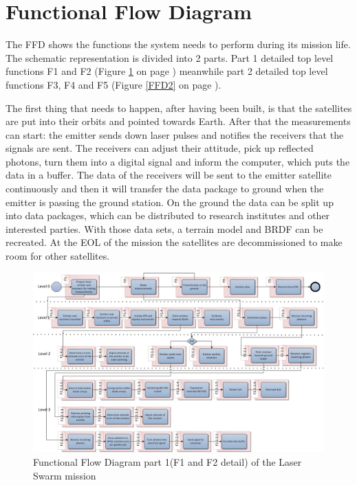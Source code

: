 \section{Functional Flow Diagram}
\label{section_FFD}
The \ac{FFD} shows the functions the system needs to perform during its mission life. The schematic representation is divided into 2 parts. Part 1 detailed top level functions F1 and F2 (Figure \ref{FFD1} on page \pageref{FFD1}) meanwhile part 2 detailed top level functions F3, F4 and F5 (Figure \ref{FFD2} on page \pageref{FFD2}).

The first thing that needs to happen, after having been built, is that the satellites are put into their orbits and pointed towards Earth. After that the measurements can start: the emitter sends down laser pulses and notifies the receivers that the signals are sent. The receivers can adjust their attitude, pick up reflected photons, turn them into a digital signal and inform the computer, which puts the data in a buffer. The data of the receivers will be sent to the emitter satellite continuously and then it will transfer the data package to ground when the emitter is passing the ground station. On the ground the data can be split up into data packages, which can be distributed to research institutes and other interested parties. With those data sets, a terrain model and \ac{BRDF} can be recreated. At the \ac{EOL} of the mission the satellites are decommissioned to make room for other satellites.

\begin{landscape}
\begin{figure}[ht!]
\centering
\includegraphics[width=1.3\textheight]{chapters/img/FFD1.jpg}
\caption{Functional Flow Diagram part 1(F1 and F2 detail) of the Laser Swarm mission}
\label{FFD1}
\end{figure}
\end{landscape}

